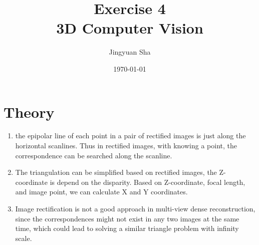 \documentclass[a4paper, twoside, english]{article}
\title{Exercise 4 \\ 3D Computer Vision}  %
\author{Jingyuan Sha}                       %
\date{\today}                              %
\begin{document}
\maketitle


\section{Theory}
\begin{enumerate}
	\item the epipolar line of each point in a pair of rectified images is just along the horizontal scanlines. Thus in rectified images, with knowing a point, the correspondence can be searched along the scanline.
	\item The triangulation can be simplified based on rectified images, the Z-coordinate is depend on the disparity. Based on Z-coordinate, focal length, and image point, we can calculate X and Y coordinates.
	\item Image rectification is not a good approach in multi-view dense reconstruction, since the correspondences might not exist in any two images at the same time, which could lead to solving a similar triangle problem with infinity scale. 
\end{enumerate}





\newpage
\end{document}

